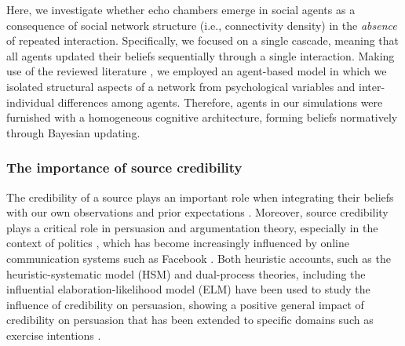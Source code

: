 \documentclass[doc,floatsintext]{apa6}
\begin{document}
Here, we investigate whether echo chambers emerge in social agents as a consequence of social network structure (i.e., connectivity density) in the \emph{absence} of repeated interaction. Specifically, we focused on a single cascade, meaning that all agents updated their beliefs sequentially through a single interaction. Making use of the reviewed literature \citep{madsen2017growing, madsen2018large}, we employed an agent-based model in which we isolated structural aspects of a network from psychological variables and inter-individual differences among agents. Therefore, agents in our simulations were furnished with a homogeneous cognitive architecture, forming beliefs normatively through Bayesian updating. 

\subsubsection{The importance of source credibility}
The credibility of a source plays an important role when integrating their beliefs with our own observations and prior expectations \citep{cuddy2011dynamics, fiske2007universal}. Moreover, source credibility plays a critical role in persuasion and argumentation theory, especially in the context of politics \citep{housholder2014facebook, robinson1999measures, cialdini2007influence}, which has become increasingly influenced by online communication systems such as Facebook \citep{bail2016combining}. Both heuristic accounts, such as the heuristic-systematic model (HSM) \citep{chaiken1999heuristic} and dual-process theories, including the influential elaboration-likelihood model (ELM) \citep{petty1986elaboration} have been used to study the influence of credibility on persuasion, showing a positive general impact of credibility on persuasion \citep{chaiken1994heuristic} that has been extended to specific domains such as exercise intentions \citep{jones2003effects}. 
\end{document}
